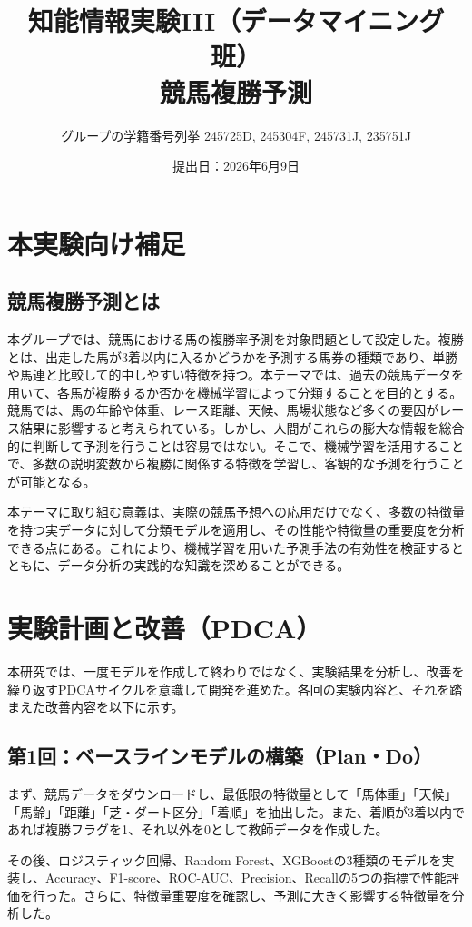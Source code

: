 \documentclass[dvipdfmx, a4paper, 11pt, titlepage]{jsarticle}
\title{知能情報実験III（データマイニング班）\\競馬複勝予測}
\author{グループの学籍番号列挙 245725D, 245304F, 245731J, 235751J}
\date{提出日：2026年6月9日}
\begin{document}
\maketitle
\tableofcontents
\clearpage


\section{本実験向け補足}

\subsection{競馬複勝予測とは}
本グループでは、競馬における馬の複勝率予測を対象問題として設定した。複勝とは、出走した馬が3着以内に入るかどうかを予測する馬券の種類であり、単勝や馬連と比較して的中しやすい特徴を持つ。本テーマでは、過去の競馬データを用いて、各馬が複勝するか否かを機械学習によって分類することを目的とする。
競馬では、馬の年齢や体重、レース距離、天候、馬場状態など多くの要因がレース結果に影響すると考えられている。しかし、人間がこれらの膨大な情報を総合的に判断して予測を行うことは容易ではない。そこで、機械学習を活用することで、多数の説明変数から複勝に関係する特徴を学習し、客観的な予測を行うことが可能となる。

本テーマに取り組む意義は、実際の競馬予想への応用だけでなく、多数の特徴量を持つ実データに対して分類モデルを適用し、その性能や特徴量の重要度を分析できる点にある。これにより、機械学習を用いた予測手法の有効性を検証するとともに、データ分析の実践的な知識を深めることができる。

\section{実験計画と改善（PDCA）}

本研究では、一度モデルを作成して終わりではなく、実験結果を分析し、改善を繰り返すPDCAサイクルを意識して開発を進めた。各回の実験内容と、それを踏まえた改善内容を以下に示す。

\subsection{第1回：ベースラインモデルの構築（Plan・Do）}

まず、競馬データ\cite{kaggle}をダウンロードし、最低限の特徴量として「馬体重」「天候」「馬齢」「距離」「芝・ダート区分」「着順」を抽出した。また、着順が3着以内であれば複勝フラグを1、それ以外を0として教師データを作成した。

その後、ロジスティック回帰、Random Forest\cite{breiman2001random}、XGBoost\cite{chen2016xgboost}の3種類のモデルを実装し、Accuracy、F1-score、ROC-AUC、Precision、Recallの5つの指標で性能評価を行った。さらに、特徴量重要度を確認し、予測に大きく影響する特徴量を分析した。
\end{document}

